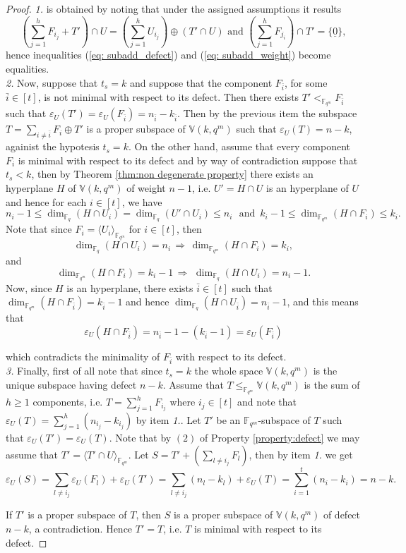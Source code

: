 \documentclass[11pt]{amsart}
\newcommand{\fqm}{\mathbb{F}_{q^m}}
\newcommand{\fq}{{\mathbb F}_{q}}
\begin{document}
\begin{proof}
  {\it 1.} is obtained by noting that under the assigned assumptions it results
 \[\left(\sum_{j=1}^{h} F_{i_j}+T'\right)\cap U=\left(\sum_{j=1}^{h} U_{i_j}\right) \oplus (T'\cap U) \,\, \text{and} \,\, \left(\sum_{j=1}^{h} F_{j_i}\right)\cap T'=\{{\underline 0}\},\]
 hence inequalities (\ref{eq: subadd_defect}) and (\ref{eq: subadd_weight}) become  equalities.\\


 { {\it 2.}}
 Now, suppose that $t_s=k$ and suppose that the component $F_{\bar i}$, for some  $\bar i\in [t]$, is not minimal with respect to its defect. Then there exists $T'<_{\fqm} F_{\bar i}$ such that $\varepsilon_U(T')=\varepsilon_U(F_{\bar i})=n_{\bar i}- k_{\bar i}$. Then by the previous item the subspace $T=\sum_{i\neq \bar i}F_i \oplus T'$ is a proper subspace of $\mathbb{V}(k,q^m)$ such that $\varepsilon_U(T)=n-k$, againist the hypotesis $t_s=k$. On the other hand, assume that every component $F_i$ is minimal with respect to its defect and by way of contradiction suppose that $t_s<k$, then by Theorem \ref{thm:non degenerate property} there exists an hyperplane $H$ of $\mathbb{V}(k,q^m)$ of weight $n-1$, i.e. $U'=H\cap U$ is an hyperplane of $U$ and hence  for each  $ i\in [t]$, we have
 \[n_i-1\leq \dim_{\fq} (H\cap U_{i})=\dim_{\fq} (U'\cap U_{i})\leq n_{i} \,\, \,\,\text{and}\,\, \, k_i-1\leq \dim_{\fqm} (H\cap F_{i})\leq k_{i}.\]
Note that since $F_i=\langle U_i\rangle_{\fqm}$ for $i\in [t]$, then  
\[\dim_{\fq} (H\cap U_{i})=n_i \, \Longrightarrow \,  \dim_{\fqm} (H\cap F_{i})=k_i,\] and
\[\dim_{\fqm} (H\cap F_{i})=k_i-1 \, \Longrightarrow \,\, \dim_{\fq} (H\cap U_{i})=n_i-1.\] Now,  since $H$ is an hyperplane, there exists $\bar i\in [t]$ such that $\dim_{\fqm} (H\cap F_{\bar i})=k_{\bar i}-1$ and hence $\dim_{\fq} (H\cap U_{\bar i})=n_{\bar i}-1$, and this means that
\[\varepsilon_U(H\cap F_{\bar i})= n_{\bar i}-1-(k_{\bar i}-1)=\varepsilon_U(F_{\bar i})\]

which contradicts the minimality of $F_{\bar i}$ with respect to its defect.\\

{{\it 3.}} Finally, first of all note that since $t_s=k$ the whole space $\mathbb{V}(k,q^m)$ is the unique subspace having defect $n-k$.   Assume that $T\leq_{\fqm} \mathbb{V}(k,q^m)$ is the sum of $h\geq 1$ components, i.e. $T=\sum_{j=1}^h F_{i_j}$ where $ i_j\in [t]$ and note that $\varepsilon_U(T)=\sum_{j=1}^h(n_{i_j}-k_{i_j})$ by item {\it 1.}. 
 Let $T'$ be an $\fqm$-subspace of $T$ such that $\varepsilon_U(T')=\varepsilon_U(T)$. Note that by $(2)$ of Property \ref{property:defect} we may assume that $T'=\langle T'\cap U\rangle_{\fqm}$. Let $S=T'+(\sum_{ l\neq i_j}^{} F_l)$, then by item {\it 1.}  we get
\[\varepsilon_U(S)=\sum_{l\neq i_j}^{}\varepsilon_U(F_{l})+\varepsilon_U(T')=\sum_{l\neq i_j}^{}(n_{l}-k_l)+\varepsilon_U(T)=\sum_{i=1}^{t}(n_i-k_i)=n-k.\]

If $T'$ is a proper subspace of $T$, then $S$ is a proper subspace of  $\mathbb{V}(k,q^m)$ of defect $n-k$, a contradiction. Hence $T'=T$, i.e. $T$ is minimal with respect to its defect.


\end{proof}
    
\end{document}
